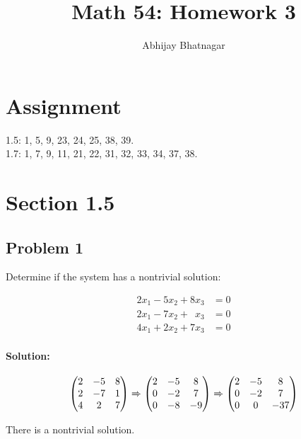 \documentclass[11pt, notitlepage]{report}
\makeatletter
\newenvironment{solution}{\paragraph{\small Solution:}}{\hfill}
\newcommand*{\toccontents}{\@starttoc{toc}}
\makeatother
\begin{document}
   \title{Math 54: Homework 3}
   \author{Abhijay Bhatnagar}
   \maketitle
   \toccontents



\setcounter{secnumdepth}{0} %
\section{Assignment}

1.5: 1, 5, 9, 23, 24, 25, 38, 39. \\
1.7: 1, 7, 9, 11, 21, 22, 31, 32, 33, 34, 37, 38.

\newpage
\section {Section 1.5}
\subsection{Problem 1}
Determine if the system has a nontrivial solution:

\begin{align*}
	2x_1-5x_2+8x_3 &= 0 \\
	2x_1-7x_2+\phantom{8}x_3 &= 0  \\
	4x_1+2x_2+7x_3 &= 0
\end{align*} 

\begin{solution}

\[
\left(\begin{matrix}{}
  2&-5 &8 \\
  2&-7 &1 \\
  4&2 &7
\end{matrix}\right)
%
\xRightarrow{}
%
\left(\begin{matrix}{}
  2&-5 &8 \\
  0&-2 &7 \\
  0&-8 &-9
\end{matrix}\right)
%
\xRightarrow{}
%
\left(\begin{matrix}{}
  2&-5 &8 \\
  0&-2 &7 \\
  0&0 &-37
\end{matrix}\right)
\]

There is a nontrivial solution.

\end{solution}
\end{document}
